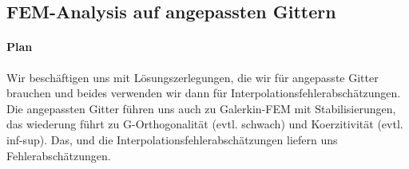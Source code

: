 \subsection{FEM-Analysis auf angepassten Gittern}
\label{sec:fem-analysis-auf}

\paragraph{Plan}
\label{sec:plan}
Wir beschäftigen uns mit Lösungszerlegungen, die wir für angepasste Gitter brauchen und beides verwenden wir dann für Interpolationsfehlerabschätzungen. Die angepassten Gitter führen uns auch zu Galerkin-FEM mit Stabilisierungen, das wiederung führt zu G-Orthogonalität (evtl. schwach) und Koerzitivität (evtl. inf-sup). Das, und die Interpolationsfehlerabschätzungen liefern uns Fehlerabschätzungen. 
\smallskip

